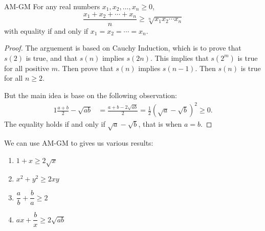 
\begin{mysubsection}{}
    \begin{theorem}[thm:]{AM-GM}
        For any real numbers $x_1, x_2, \ldots, x_n \geq 0$, \[\frac{x_1 + x_2 + \cdots + x_n}{n} \geq \sqrt[n]{x_1 x_2 \cdots x_n}\] with equality if and only if $x_1 = x_2 = \cdots = x_n$. 
    \end{theorem}
    \begin{proof}
        The arguement is based on Cauchy Induction, which is to prove that $s(2)$ is true, and that $s(n)$ implies $s(2n)$. This implies that $s(2^m)$ is true for all positive $m$. Then prove that $s(n)$ implies $s(n-1)$. Then $s(n)$ is true for all $n\geq 2$. 

        But the main idea is base on the following observation:
        \begin{alignat*}{1}
            \frac{a+b}{2}-\sqrt{ab}&= \frac{a+b-2\sqrt{ab}}{2} =\frac{1}{2} \left(\sqrt{a}-\sqrt{b}\right)^2\geq 0.
        \end{alignat*}
        The equality holds if and only if $\sqrt{a}-\sqrt{b}$, that is when $a=b$.
    \end{proof}

    We can use AM-GM to gives us various results:
    \begin{enumerate}
        \item $1+x\geq 2\sqrt{x}$
        \item $x^2+y^2\geq 2xy$
        \item $\dfrac{a}{b}+\dfrac{b}{a}\geq 2$
        \item $ax+\dfrac{b}{x}\geq 2\sqrt{ab}$
    \end{enumerate}
\end{mysubsection}

